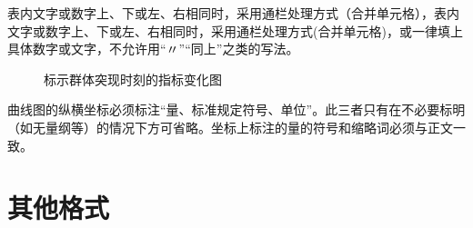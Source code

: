 \documentclass{cqupt_thesis}
\begin{document}
    表内文字或数字上、下或左、右相同时，采用通栏处理方式（合并单元格），表内文字或数字上、下或左、右相同时，采用通栏处理方式(合并单元格)，或一律填上具体数字或文字，不允许用“〃”“同上”之类的写法。


    \begin{figure}[H]
        \centering


        \centering
        \caption[标示群体突现时刻的指标变化图]{ 标示群体突现时刻的指标变化图\cite{陈浩元2015gb} }
    \end{figure}
    曲线图的纵横坐标必须标注“量、标准规定符号、单位”。此三者只有在不必要标明（如无量纲等）的情况下方可省略。坐标上标注的量的符号和缩略词必须与正文一致。


    \chapter{其他格式}
\end{document}
